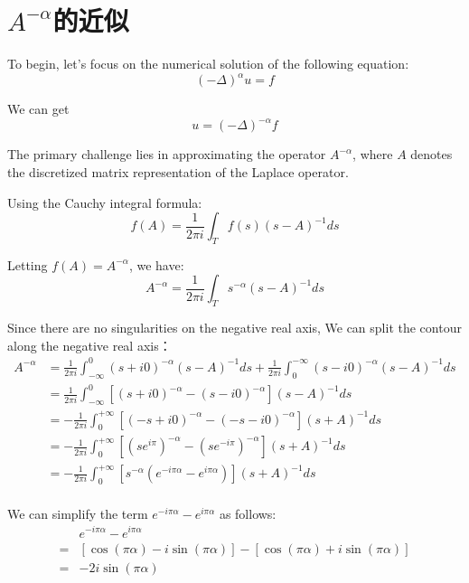 \chapter{${A}^{-\alpha}$的近似}

To begin, let's focus on the numerical solution of the following equation:
\begin{equation}
	(-\Delta)^\alpha u = f 
\end{equation}

We can get
\begin{equation}
	u = (-\Delta)^{-\alpha} f
\end{equation}

The primary challenge lies in approximating the operator $A^{-\alpha}$, where $A$ denotes the discretized matrix representation of the Laplace operator.

Using the Cauchy integral formula:
\begin{equation}
	f(A)=\frac{1}{2 \pi i} \int_T f(s)(s-A)^{-1} d s
\end{equation}

Letting $f(A) = A^{-\alpha}$, we have:
\begin{equation}
	A^{-\alpha}=\frac{1}{2 \pi i} \int_T s^{-\alpha}(s-A)^{-1} d s
\end{equation}

Since there are no singularities on the negative real axis, We can split the contour along the negative real axis：
\begin{equation}
	\begin{aligned}
	A^{-\alpha}&=\frac{1}{2 \pi i} \int_{-\infty}^0(s+i 0)^{-\alpha}(s-A)^{-1} d s+\frac{1}{2 \pi i} \int_0^{-\infty}(s-i 0)^{-\alpha}(s-A)^{-1} d s \\
	&=\frac{1}{2 \pi i} \int_{-\infty}^0[(s+i 0)^{-\alpha}-(s-i 0)^{-\alpha}](s-A)^{-1} d s\\
	&=-\frac{1}{2 \pi i} \int_{0}^{+\infty}[(-s+i 0)^{-\alpha}-(-s-i 0)^{-\alpha}](s+A)^{-1} d s\\
	&=-\frac{1}{2 \pi i} \int_{0}^{+\infty}[(se^{i \pi})^{-\alpha}-(se^{-i \pi})^{-\alpha}](s+A)^{-1} d s\\
	&=-\frac{1}{2 \pi i} \int_{0}^{+\infty}[s^{-\alpha}(e^{-i \pi\alpha}-e^{i \pi \alpha})](s+A)^{-1} d s\\
\end{aligned}
\end{equation}

We can simplify the term $e^{-i\pi\alpha}-e^{i\pi\alpha}$ as follows:
\begin{equation}
	\begin{aligned}
	&e^{-i \pi\alpha}-e^{i \pi \alpha}\\
	=&[\cos(\pi \alpha)-i \sin(\pi \alpha)]-[\cos(\pi \alpha)+i \sin(\pi \alpha)]\\
	=&-2 i \sin(\pi \alpha)
\end{aligned}
\end{equation}

